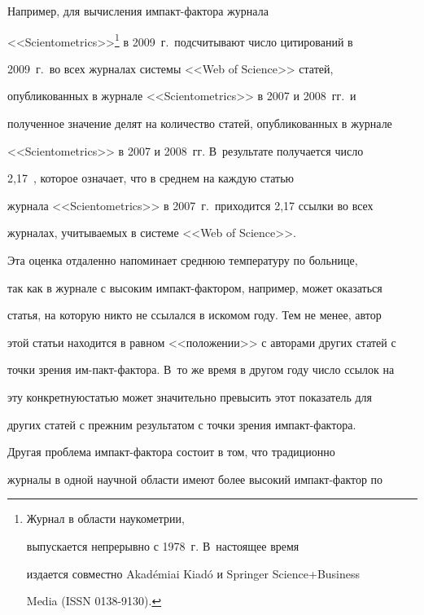     


    Например, для вычисления импакт-фактора журнала 


<<Scientometrics>>\footnote[4]{Журнал в области наукометрии, 


выпускается непрерывно с 1978~г. В~настоящее время 


издается совместно Akad\'{e}miai Kiad\'{o} и Springer Science\;+\;Business 


Media (ISSN 0138-9130).} в 2009~г.\ подсчитывают число цитирований в 


2009~г.\ во всех журналах системы <<Web of Science>> статей, 


опубликованных в журнале <<Scientometrics>> в 2007 и 2008~гг.\, и 


полученное значение делят на количество статей, опубликованных в журнале 


<<Scientometrics>> в 2007 и 2008~гг. В~результате получается число 


2,17~\cite{2-2-14},  которое означает, что в среднем на каждую статью 


журнала <<Scientometrics>> в 2007~г.\ приходится 2,17 ссылки во всех 


журналах, учитываемых в системе <<Web of Science>>.


    


    Эта оценка отдаленно напоминает среднюю температуру по больнице, 


так как в журнале с высоким импакт-фактором, например, может оказаться 


статья, на которую никто не ссылался в искомом году. Тем не менее, автор 


этой статьи находится в равном <<положении>> с авторами других статей с 


точки зре\-ния им-\linebreak пакт-фак\-то\-ра. В~то же время в другом году число ссылок на 


эту кон\-крет\-ную\linebreak статью может значительно превысить этот показатель для 


других ста\-тей с прежним результатом с точки зрения импакт-фактора.


    


    Другая проблема импакт-фактора состоит в том, что традиционно 


журналы в одной научной области имеют более высокий импакт-фактор по 


